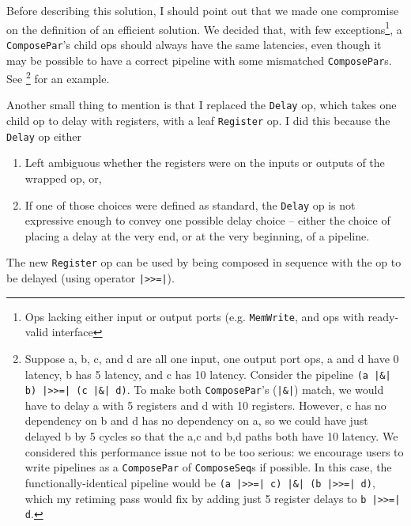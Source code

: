 \documentclass[12pt]{article}
\begin{document}
Before describing this solution, I should point out that we made one
compromise on the definition of an efficient solution. We decided
that, with few exceptions\footnote{Ops lacking either input or output
  ports (e.g. \texttt{MemWrite}, and ops with ready-valid interface},
a \texttt{ComposePar}'s child ops should always have the same
latencies, even though it may be possible to have a correct pipeline
with some mismatched \texttt{ComposePar}s. See \footnote{Suppose
a, b, c, and d are all one input, one output port ops, a and d have 0
latency, b has 5 latency, and c has 10 latency. Consider the pipeline
\texttt{(a |\&| b) |>>=| (c |\&| d)}. To make both \texttt{ComposePar}'s
(\texttt{|\&|}) match, we would have to delay a with 5 registers
and d with 10 registers. However, c has no dependency on b and d has
no dependency on a, so we could have just delayed b by 5 cycles so
that the a,c and b,d paths both have 10 latency. We considered
this performance issue not to be too serious: we encourage users to
write pipelines as a \texttt{ComposePar} of \texttt{ComposeSeq}s if
possible. In this case, the functionally-identical pipeline would
be \texttt{(a |>>=| c) |\&| (b |>>=| d)}, which my retiming pass would
fix by adding just 5 register delays to \texttt{b |>>=| d}.
} for an example.

Another small thing to mention is that I replaced the \texttt{Delay}
op, which takes one child op to delay with registers, with a leaf
\texttt{Register} op. I did this because the \texttt{Delay} op either
\begin{enumerate}
\item Left ambiguous whether the registers were on the inputs or
  outputs of the wrapped op, or,
\item If one of those choices were defined as standard, the
  \texttt{Delay} op is not expressive enough to convey one
  possible delay choice -- either the choice of placing a delay
  at the very end, or at the very beginning, of a pipeline.
\end{enumerate}
The new \texttt{Register} op can be used by being composed in
sequence with the op to be delayed (using operator \texttt{|>>=|}).
\end{document}
